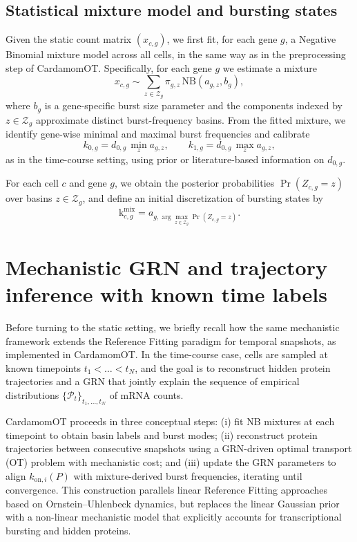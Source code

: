 \documentclass[10pt]{article}
\begin{document}
\subsection{Statistical mixture model and bursting states}

Given the static count matrix $(x_{c,g})$, we first fit, for each gene $g$, a Negative Binomial mixture model across all cells, in the same way as in the preprocessing step of CardamomOT.  Specifically, for each gene $g$ we estimate a mixture
\[
x_{c,g} \sim \sum_{z\in\mathcal{Z}_g} \pi_{g,z} \,\mathrm{NB}(a_{g,z}, b_g),
\]
where $b_g$ is a gene-specific burst size parameter and the components indexed by $z\in\mathcal{Z}_g$ approximate distinct burst-frequency basins.  From the fitted mixture, we identify gene-wise minimal and maximal burst frequencies and calibrate
\[
k_{0,g} = d_{0,g} \,\min_{z} a_{g,z},
\qquad
k_{1,g} = d_{0,g} \,\max_{z} a_{g,z},
\]
as in the time-course setting, using prior or literature-based information on $d_{0,g}$. 

For each cell $c$ and gene $g$, we obtain the posterior probabilities $\Pr(Z_{c,g}=z)$ over basins $z\in\mathcal{Z}_g$, and define an initial discretization of bursting states by
\[
\mathrm{k}_{c,g}^{\mathrm{mix}} = a_{g, \arg\max_{z\in\mathcal{Z}_g} \Pr(Z_{c,g}=z)}.
\]


\section{Mechanistic GRN and trajectory inference with known time labels}

Before turning to the static setting, we briefly recall how the same mechanistic framework extends the Reference Fitting paradigm \cite{zhang2024joint} for temporal snapshots, as implemented in CardamomOT.  In the time-course case, cells are sampled at known timepoints $t_1<\dots<t_N$, and the goal is to reconstruct hidden protein trajectories and a GRN that jointly explain the sequence of empirical distributions $\{\mathcal{P}_t\}_{t_1,\dots,t_N}$ of mRNA counts.  

CardamomOT proceeds in three conceptual steps: (i) fit NB mixtures at each timepoint to obtain basin labels and burst modes; (ii) reconstruct protein trajectories between consecutive snapshots using a GRN-driven optimal transport (OT) problem with mechanistic cost; and (iii) update the GRN parameters to align $k_{\mathrm{on},i}(P)$ with mixture-derived burst frequencies, iterating until convergence.  This construction parallels linear Reference Fitting approaches based on Ornstein–Uhlenbeck dynamics, but replaces the linear Gaussian prior with a non-linear mechanistic model that explicitly accounts for transcriptional bursting and hidden proteins. 
\end{document}
